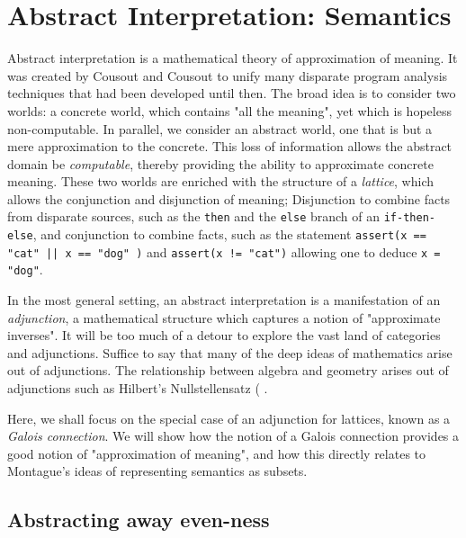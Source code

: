\documentclass[11pt]{book}
\begin{document}

\chapter{Abstract Interpretation: Semantics}

Abstract interpretation is a mathematical theory of approximation of meaning. It was created by Cousout and Cousout to unify many disparate program analysis techniques that had been developed until then. The broad idea is to consider two worlds: a concrete world, which contains "all the meaning", yet which is hopeless non-computable. In parallel, we consider an abstract world, one that is but a mere approximation to the concrete. This loss of information allows the abstract domain be \emph{computable}, thereby providing the ability to
approximate concrete meaning. These two worlds are enriched with the structure of a \emph{lattice}, which allows the conjunction and disjunction of meaning; Disjunction to combine facts from disparate sources, such as the \texttt{then} and the \texttt{else} branch of an \texttt{if-then-else}, and conjunction to combine facts, such as the statement \texttt{assert(x == "cat" || x == "dog" )} and \texttt{assert(x != "cat")} allowing one to deduce \texttt{x = "dog"}. 


In the most general setting, an abstract interpretation is a manifestation of an \emph{adjunction}, a mathematical structure which captures a notion of "approximate inverses". It will be too much of a detour to explore the vast land of categories and adjunctions. Suffice to say that many of the deep ideas of mathematics arise out of adjunctions. The relationship between algebra and geometry arises out of adjunctions such as Hilbert's Nullstellensatz (%
. 

Here, we shall focus on the special case of an adjunction for lattices, known as a \emph{Galois connection}. We will show how the notion of a Galois connection provides a good notion of "approximation of meaning", and how this directly relates to Montague's ideas of representing semantics as subsets.

\section{Abstracting away even-ness}
\end{document}
